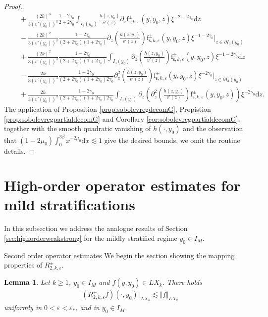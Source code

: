 \documentclass[11pt,reqno]{amsproc}
\makeatletter
\renewcommand\subsection{\@startsection{subsection}{2}%
\normalparindent{.5\linespacing\@plus.7\linespacing}{-.5em}
{\normalfont\bfseries}}
\newtheorem{lemma}[proposition]{Lemma}
\theoremstyle{definition}
\numberwithin{equation}{section}
\newcommand{\s}{{\mathsf{s}}}
\renewcommand{\d}{\mathrm{d}}
\newcommand{\ep}{\varepsilon}
\makeatother
\begin{document}
\begin{proof}
\begin{align*}
&\quad +\frac{(2k)^3}{3(v'(y_0))^3}\frac{1-2\gamma_0}{2+2\gamma_0}\int_{I_3(y_0)} \frac{h(z,y_0)}{v'(z)} \partial_z \mathrm{f}_{\s,k,\ep}^\pm(y,y_0,z) \xi^{-2-2\gamma_0} \d z \\
&\quad  - \frac{(2k)^2}{3(v'(y_0))^3}\frac{1-2\gamma_0}{(2+2\gamma_0)(1+2\gamma_0)} \partial_z \left(\frac{h(z,y_0)}{v'(z)}\right) \mathrm{f}_{\s,k,\ep}^\pm(y,y_0,z) \xi^{-1-2\gamma_0} \Big|_{z\in \partial I_3(y_0)} \\
&\quad + \frac{(2k)^2}{3(v'(y_0))^3}\frac{1-2\gamma_0}{(2+2\gamma_0)(1+2\gamma_0)} \int_{I_3(y_0)} \partial_z \left(\frac{h(z,y_0)}{v'(z)}\right)\mathrm{f}_{\s,k,\ep}^\pm(y,y_0,z) \xi^{-1-2\gamma_0} \d z \\
&\quad - \frac{2k}{3(v'(y_0))^3}\frac{1-2\gamma_0}{(2+2\gamma_0)(1+2\gamma_0)2\gamma_0} \partial_z^2 \left(\frac{h(z,y_0)}{v'(z)}\right) \mathrm{f}_{\s,k,\ep}^\pm(y,y_0,z) \xi^{-2\gamma_0} \Big|_{z\in \partial I_3(y_0)} \\
&\quad +  \frac{2k}{3(v'(y_0))^3}\frac{1-2\gamma_0}{(2+2\gamma_0)(1+2\gamma_0)2\gamma_0} \int_{I_3(y_0)}\partial_z \left( \partial_z^2 \left(\frac{h(z,y_0)}{v'(z)}\right)\mathrm{f}_{\s,k,\ep}^\pm(y,y_0,z) \right) \xi^{-2\gamma_0} \d z.
\end{align*}
The application of Proposition \ref{prop:sobolevregdecomG}, Propistion \ref{prop:sobolevregpartialdecomG} and Corollary \ref{cor:sobolevregpartialdecomG}, together with the smooth quadratic vanishing of $h(\cdot, y_0)$ and the observation that $(1-2\mu_0)\int_0^{3\beta}x^{-2\mu_0}\d x \lesssim 1$ give the desired bounds, we omit the routine details.
\end{proof}


\section{High-order operator estimates for mild stratifications}\label{sec:highordermild}
In this subsection we address the analogue results of Section \ref{sec:highorderweakstrong} for the mildly stratified regime $y_0\in I_M$. 

\subsection{Second order operator estimates}
We begin the section showing the mapping properties of $R_{2,k,\ep}^\pm$.
\begin{lemma}\label{lemma:R2mapsLXktoLXk}
Let $k\geq 1$, $y_0\in I_M$ and $f(y,y_0)\in LX_k$. There holds
\begin{align*}
\Vert (R_{2,k,\ep}^\pm f)(\cdot,y_0) \Vert_{LX_k} \lesssim  \Vert f \Vert_{LX_k} 
\end{align*}
uniformly in $0<\ep<\ep_*$, and in $y_0\in I_M$.
\end{lemma}
\end{document}
